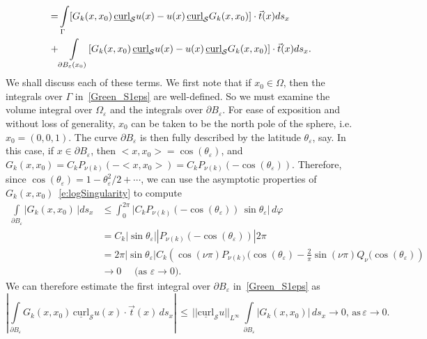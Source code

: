 \documentclass[final]{siamltex}
\newcommand{\C}{C_k}
\renewcommand{\S} {\mathcal{S}}
\begin{document}
{\begin{align}
=&\int\limits_\Gamma [ G_k(x,x_0)\,\underline{\mbox{curl}}_{\S} u(x) -
u(x)\,\underline{\mbox{curl}}_{\S} G_k(x,x_0)]\cdot \vec{t}(x) ds_x \notag\\
+&\int\limits_{\partial B_{\varepsilon}(x_0)} [
G_k(x,x_0)\,\underline{\mbox{curl}}_{\S} u(x) -
u(x)\,\underline{\mbox{curl}}_{\S} G_k(x,x_0)]\cdot \vec{t}(x)
ds_x.
\end{align}
We shall discuss each of these terms. We first note that if $x_0\in
\Omega$, then the integrals over $\Gamma$ in~\eqref{Green_S1eps} are
well-defined. So we must examine the volume integral over
$\Omega_\varepsilon$ and the integrals over $\partial B_\varepsilon$.
For ease of exposition and without loss of generality,  $x_0$ can be
taken to be the north pole of the sphere, i.e.
$x_0=\left(0,0,1\right)$. The curve $\partial B_{\varepsilon}$ is then
fully described by the latitude $\theta_{\varepsilon}$, say.  In this
case, if $x\in \partial B_\varepsilon$, then $<x,x_{0}> =
\cos(\theta_\varepsilon)$, and  $G_k(x,x_0) = \C
P_{\nu(k)}\left(-<x,x_{0}>\right) = \C
P_{\nu(k)}\left(-\cos(\theta_\varepsilon)\right).$ Therefore, since
$\cos(\theta_\varepsilon) = 1- \theta^2_\varepsilon/2 + \cdots$, we can
use the asymptotic properties of $G_k(x,x_0)$~\eqref{e:logSingularity}
to compute
\begin{align*}
 \int\limits_{\partial B_{\varepsilon}}\vert G_k(x,x_0)\,\vert  ds_x &\leq \int_{0}^{2\pi}\vert \C P_{\nu(k)}(-\cos(\theta_\varepsilon))  \, \sin\theta_{\varepsilon}| \, d\varphi\\
&= \C|\sin\theta_{\varepsilon}||P_{\nu(k)}(-\cos(\theta_\varepsilon)) | 2\pi \\
&= 2 \pi |\sin\theta_{\varepsilon}|\C \left(\cos(\nu\pi) P_{\nu(k)}(\cos(\theta_\varepsilon) - \frac{2}{\pi}\sin(\nu \pi)Q_\nu(
\cos(\theta_\varepsilon)\right)\\
&\rightarrow 0 \quad \mbox{ (as $\varepsilon\rightarrow 0$)}.
\end{align*}
We can therefore estimate the first integral over $\partial B_\varepsilon$ in~\eqref{Green_S1eps} as
\[\left|\int\limits_{\partial B_{\varepsilon}} G_k(x,x_0)\,\underline{\mbox{curl}}_{\S} u(x)\cdot\vec{t}(x)\, ds_x\right|\, 
\leq\, ||\underline{\mbox{curl}}_{\S}u||_{L^{\infty}} \, \int\limits_{\partial B_{\varepsilon}} |G_k(x,x_0)|\,ds_x \rightarrow 0, \, \mbox{as}\, \varepsilon \rightarrow 0.\]

}
\end{document}
